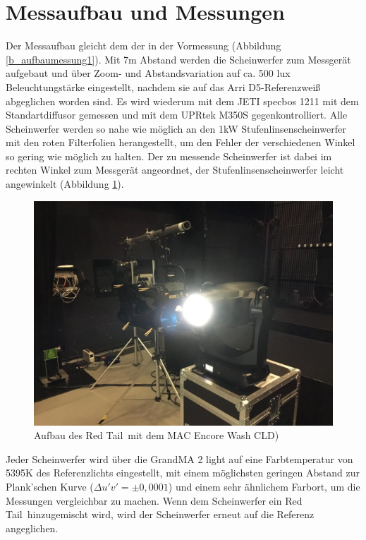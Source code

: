 \section{Messaufbau und Messungen}
\label{sec_hmaufbau}
Der Messaufbau gleicht dem der in der Vormessung (Abbildung \ref{b_aufbaumessung1}). Mit 7m Abstand werden die Scheinwerfer zum Messgerät aufgebaut und über Zoom- und Abstandsvariation auf ca. 500 lux Beleuchtungstärke eingestellt, nachdem sie auf das Arri D5-Referenzweiß abgeglichen worden sind. Es wird wiederum mit dem JETI specbos 1211 mit dem Standartdiffusor gemessen und mit dem UPRtek M350S gegenkontrolliert. Alle Scheinwerfer werden so nahe wie möglich an den 1kW Stufenlinsenscheinwerfer mit den roten Filterfolien herangestellt, um den Fehler der verschiedenen Winkel so gering wie möglich zu halten. Der zu messende Scheinwerfer ist dabei im rechten Winkel zum Messgerät angeordnet, der Stufenlinsenscheinwerfer leicht angewinkelt (Abbildung \ref{b_messbild1}). 

\begin{figure}[H]     %
\centering
\includegraphics[width=1.0\textwidth]{bilder/messbild1} 
\caption {Aufbau des \glqq Red Tail\grqq\ mit dem MAC Encore Wash CLD)}\label{b_messbild1}
\end{figure}

Jeder Scheinwerfer wird über die GrandMA 2 light auf eine Farbtemperatur von 5395K des Referenzlichts eingestellt, mit einem möglichsten geringen Abstand zur Plank'schen Kurve ($ \Delta u'v'=\pm0,0001$) und einem sehr ähnlichem Farbort, um die Messungen vergleichbar zu machen. Wenn dem Scheinwerfer ein \glqq Red Tail\grqq\ hinzugemischt wird, wird der Scheinwerfer erneut auf die Referenz angeglichen. 

